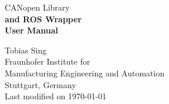 \begin{titlepage}
\vspace*{13mm}
\begin{center}
  \vspace{10mm} 
         {\large CANopen Library\\}
  \vspace{10mm}
       {\Large
          \bf
          and ROS Wrapper\\} 
  \vspace{5mm}
       {\Large
          \bf
          User Manual\\}

  \vspace{60mm}
  \vspace{10mm}
         {\large Tobias Sing} \\
  \vspace{5mm}
         {\large Fraunhofer Institute for}\\
         {\large Manufacturing Engineering and Automation} \\
         \vspace{5mm}
         {\large Stuttgart, Germany} \\
  \vfill
         {\large \hspace{20mm} Last modified on \today}
\end{center}
\end{titlepage}

\clearpage
\thispagestyle{empty}
\cleardoublepage
